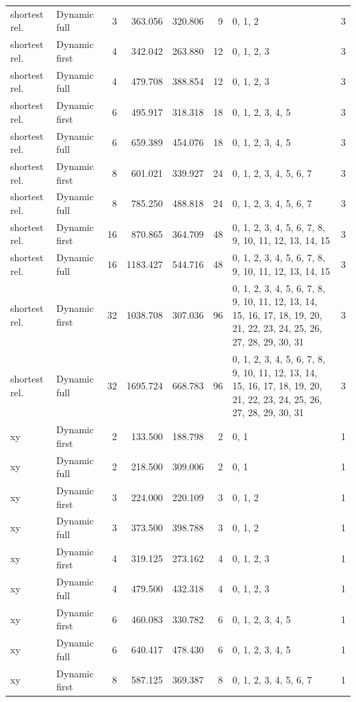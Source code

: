 \documentclass[10pt,a4paper]{article}
\begin{document}
\begin{longtable}{@{}p{23mm}p{29mm}rrrrp{36mm}r@{}}
shortest rel. & Dynamic full & 3 & 363.056 & 320.806 & 9 & 0, 1, 2 & 3 \\
shortest rel. & Dynamic first & 4 & 342.042 & 263.880 & 12 & 0, 1, 2, 3 & 3 \\
shortest rel. & Dynamic full & 4 & 479.708 & 388.854 & 12 & 0, 1, 2, 3 & 3 \\
shortest rel. & Dynamic first & 6 & 495.917 & 318.318 & 18 & 0, 1, 2, 3, 4, 5 & 3 \\
shortest rel. & Dynamic full & 6 & 659.389 & 454.076 & 18 & 0, 1, 2, 3, 4, 5 & 3 \\
shortest rel. & Dynamic first & 8 & 601.021 & 339.927 & 24 & 0, 1, 2, 3, 4, 5, 6, 7 & 3 \\
shortest rel. & Dynamic full & 8 & 785.250 & 488.818 & 24 & 0, 1, 2, 3, 4, 5, 6, 7 & 3 \\
shortest rel. & Dynamic first & 16 & 870.865 & 364.709 & 48 & 0, 1, 2, 3, 4, 5, 6, 7, 8, 9, 10, 11, 12, 13, 14, 15 & 3 \\
shortest rel. & Dynamic full & 16 & 1183.427 & 544.716 & 48 & 0, 1, 2, 3, 4, 5, 6, 7, 8, 9, 10, 11, 12, 13, 14, 15 & 3 \\
shortest rel. & Dynamic first & 32 & 1038.708 & 307.036 & 96 & 0, 1, 2, 3, 4, 5, 6, 7, 8, 9, 10, 11, 12, 13, 14, 15, 16, 17, 18, 19, 20, 21, 22, 23, 24, 25, 26, 27, 28, 29, 30, 31 & 3 \\
shortest rel. & Dynamic full & 32 & 1695.724 & 668.783 & 96 & 0, 1, 2, 3, 4, 5, 6, 7, 8, 9, 10, 11, 12, 13, 14, 15, 16, 17, 18, 19, 20, 21, 22, 23, 24, 25, 26, 27, 28, 29, 30, 31 & 3 \\
xy & Dynamic first & 2 & 133.500 & 188.798 & 2 & 0, 1 & 1 \\
xy & Dynamic full & 2 & 218.500 & 309.006 & 2 & 0, 1 & 1 \\
xy & Dynamic first & 3 & 224.000 & 220.109 & 3 & 0, 1, 2 & 1 \\
xy & Dynamic full & 3 & 373.500 & 398.788 & 3 & 0, 1, 2 & 1 \\
xy & Dynamic first & 4 & 319.125 & 273.162 & 4 & 0, 1, 2, 3 & 1 \\
xy & Dynamic full & 4 & 479.500 & 432.318 & 4 & 0, 1, 2, 3 & 1 \\
xy & Dynamic first & 6 & 460.083 & 330.782 & 6 & 0, 1, 2, 3, 4, 5 & 1 \\
xy & Dynamic full & 6 & 640.417 & 478.430 & 6 & 0, 1, 2, 3, 4, 5 & 1 \\
xy & Dynamic first & 8 & 587.125 & 369.387 & 8 & 0, 1, 2, 3, 4, 5, 6, 7 & 1 \\

\end{longtable}
\end{document}
